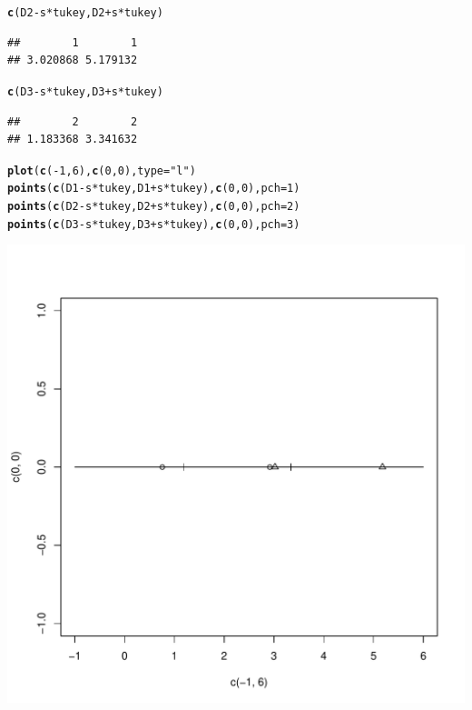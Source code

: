 \documentclass{article}\usepackage[]{graphicx}\usepackage[]{color}
\makeatletter
\def\maxwidth{ %
  \ifdim\Gin@nat@width>\linewidth
    \linewidth
  \else
    \Gin@nat@width
  \fi
}
\newcommand{\hlnum}[1]{\textcolor[rgb]{0.686,0.059,0.569}{#1}}%
\newcommand{\hlstr}[1]{\textcolor[rgb]{0.192,0.494,0.8}{#1}}%
\newcommand{\hlopt}[1]{\textcolor[rgb]{0,0,0}{#1}}%
\newcommand{\hlstd}[1]{\textcolor[rgb]{0.345,0.345,0.345}{#1}}%
\newcommand{\hlkwc}[1]{\textcolor[rgb]{0.333,0.667,0.333}{#1}}%
\newcommand{\hlkwd}[1]{\textcolor[rgb]{0.737,0.353,0.396}{\textbf{#1}}}%
\newenvironment{kframe}{%
 \def\at@end@of@kframe{}%
 \ifinner\ifhmode%
  \def\at@end@of@kframe{\end{minipage}}%
  \begin{minipage}{\columnwidth}%
 \fi\fi%
 \def\FrameCommand##1{\hskip\@totalleftmargin \hskip-\fboxsep
 \colorbox{shadecolor}{##1}\hskip-\fboxsep
     \hskip-\linewidth \hskip-\@totalleftmargin \hskip\columnwidth}%
 \MakeFramed {\advance\hsize-\width
   \@totalleftmargin\z@ \linewidth\hsize
   \@setminipage}}%
 {\par\unskip\endMakeFramed%
 \at@end@of@kframe}
\newenvironment{knitrout}{}{} %
\makeatother
\begin{document}
\begin{enumerate}[(a)]
\begin{knitrout}
\begin{kframe}
\begin{alltt}
  \hlkwd{c}\hlstd{(D2}\hlopt{-}\hlstd{s}\hlopt{*}\hlstd{tukey, D2}\hlopt{+}\hlstd{s}\hlopt{*}\hlstd{tukey)}
\end{alltt}
\begin{verbatim}
##        1        1 
## 3.020868 5.179132
\end{verbatim}
\begin{alltt}
  \hlkwd{c}\hlstd{(D3}\hlopt{-}\hlstd{s}\hlopt{*}\hlstd{tukey, D3}\hlopt{+}\hlstd{s}\hlopt{*}\hlstd{tukey)}
\end{alltt}
\begin{verbatim}
##        2        2 
## 1.183368 3.341632
\end{verbatim}
\begin{alltt}
  \hlkwd{plot}\hlstd{(}\hlkwd{c}\hlstd{(}\hlopt{-}\hlnum{1}\hlstd{,} \hlnum{6}\hlstd{),} \hlkwd{c}\hlstd{(}\hlnum{0}\hlstd{,} \hlnum{0}\hlstd{),} \hlkwc{type} \hlstd{=} \hlstr{"l"}\hlstd{)}
  \hlkwd{points}\hlstd{(}\hlkwd{c}\hlstd{(D1}\hlopt{-}\hlstd{s}\hlopt{*}\hlstd{tukey, D1}\hlopt{+}\hlstd{s}\hlopt{*}\hlstd{tukey),} \hlkwd{c}\hlstd{(}\hlnum{0}\hlstd{,} \hlnum{0}\hlstd{),} \hlkwc{pch} \hlstd{=} \hlnum{1}\hlstd{)}
  \hlkwd{points}\hlstd{(}\hlkwd{c}\hlstd{(D2}\hlopt{-}\hlstd{s}\hlopt{*}\hlstd{tukey, D2}\hlopt{+}\hlstd{s}\hlopt{*}\hlstd{tukey),} \hlkwd{c}\hlstd{(}\hlnum{0}\hlstd{,} \hlnum{0}\hlstd{),} \hlkwc{pch} \hlstd{=} \hlnum{2}\hlstd{)}
  \hlkwd{points}\hlstd{(}\hlkwd{c}\hlstd{(D3}\hlopt{-}\hlstd{s}\hlopt{*}\hlstd{tukey, D3}\hlopt{+}\hlstd{s}\hlopt{*}\hlstd{tukey),} \hlkwd{c}\hlstd{(}\hlnum{0}\hlstd{,} \hlnum{0}\hlstd{),} \hlkwc{pch} \hlstd{=} \hlnum{3}\hlstd{)}
\end{alltt}
\end{kframe}
\includegraphics[width=\maxwidth]{figure/unnamed-chunk-7-1} 


\end{knitrout}
\end{enumerate}
\end{document}
